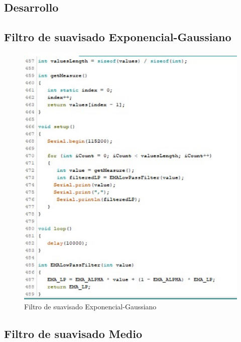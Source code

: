 \documentclass[10pt,a4paper]{article}
\begin{document}
\begin{multicols}{2}
\begin{itemize}
\section{Desarrollo}
\subsection{Filtro  de suavisado Exponencial-Gaussiano}


\begin{figure}[H]
\centering
\includegraphics[scale=0.65]{codgauss.PNG}
\caption{Filtro de suavisado Exponencial-Gaussiano}
\end{figure}




\subsection{Filtro de suavisado Medio}


\end{itemize}
\end{multicols}
\end{document}
